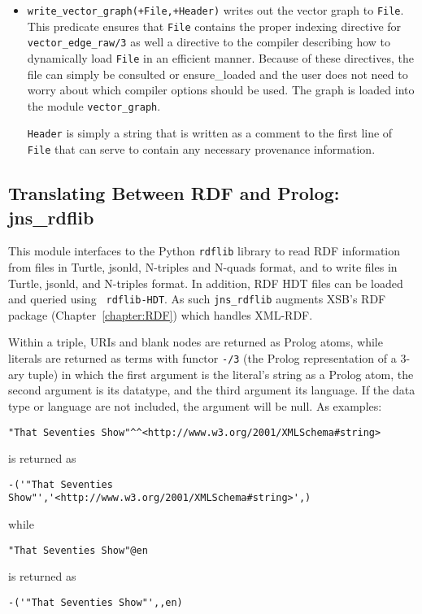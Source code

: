 \begin{itemize}
\item {\tt write\_vector\_graph(+File,+Header)} writes out the vector
  graph to {\tt File}.  This predicate ensures that {\tt File}
  contains the proper indexing directive for {\tt vector\_edge\_raw/3}
  as well a directive to the compiler describing how to dynamically
  load {\tt File} in an efficient manner.  Because of these
  directives, the file can simply be consulted or ensure\_loaded and
  the user does not need to worry about which compiler options should
  be used.  The graph is loaded into the module {\tt vector\_graph}.

  {\tt Header} is simply a string that is written as a comment to the
  first line of {\tt File} that can serve to contain any necessary
  provenance information.
\end{itemize}  

\subsection{Translating Between RDF and Prolog: jns\_rdflib} \label{sec:jns-rdflib}
This module interfaces to the Python {\tt rdflib} library to read RDF
information from files in Turtle, jsonld, N-triples and N-quads
format, and to write files in Turtle, jsonld, and N-triples format.  In
addition, RDF HDT files can be loaded and queried using {\tt
  rdflib-HDT}.  As such {\tt jns\_rdflib} augments XSB's RDF package
(Chapter~\ref{chapter:RDF}) which handles XML-RDF.

Within a triple, URIs and blank nodes are returned as Prolog atoms,
while literals are returned as terms with functor {\tt -/3} (the
Prolog representation of a 3-ary tuple) in which the first argument is
the literal's string as a Prolog atom, the second argument is its
datatype, and the third argument its language. If the data type or
language are not included, the argument will be null.  As examples:

\begin{verbatim}
"That Seventies Show"^^<http://www.w3.org/2001/XMLSchema#string> 
\end{verbatim}
is returned as 
\begin{verbatim}
-('"That Seventies Show"','<http://www.w3.org/2001/XMLSchema#string>',) 
\end{verbatim}
while 
\begin{verbatim}
"That Seventies Show"@en
\end{verbatim}
is returned as
\begin{verbatim}
-('"That Seventies Show"',,en) 
\end{verbatim}

